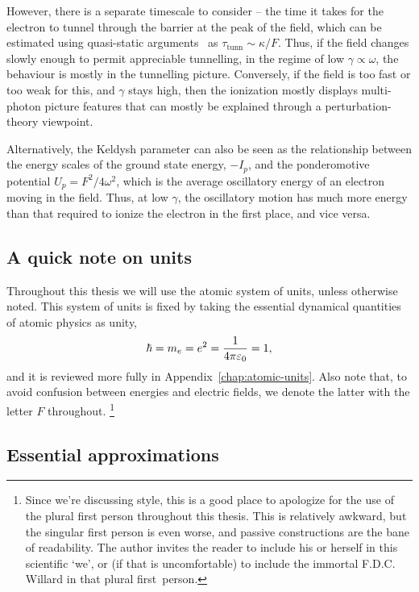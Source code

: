 However, there is a separate timescale to consider -- the time it takes for the electron to tunnel through the barrier at the peak of the field, which can be estimated using quasi-static arguments~\cite{landau_QM} as $\tau_\mathrm{tunn}\sim\kappa/F$. Thus, if the field changes slowly enough to permit appreciable tunnelling, in the regime of low $\gamma\propto\omega$, the behaviour is mostly in the tunnelling picture. Conversely, if the field is too fast or too weak for this, and $\gamma$ stays high, then the ionization mostly displays multi-photon picture features that can mostly be explained through a perturbation-theory viewpoint.

Alternatively, the Keldysh parameter can also be seen as the relationship between the energy scales of the ground state energy, $-I_p$, and the ponderomotive potential \mbox{$U_p=F^2/4\omega^2$}, which is the average oscillatory energy of an electron moving in the field. Thus, at low $\gamma$, the oscillatory motion has much more energy than that required to ionize the electron in the first place, and vice versa.




\subsection{A quick note on units}
Throughout this thesis we will use the atomic system of units, unless otherwise noted. This system of units is fixed by taking the essential dynamical quantities of atomic physics as unity,
\begin{equation}
\hbar = m_e = e^2 = \frac{1}{4\pi\varepsilon_0} = 1,
\end{equation}
and it is reviewed more fully in Appendix~\ref{chap:atomic-units}. Also note that, to avoid confusion between energies and electric fields, we denote the latter with the letter $F$ throughout.%
\footnote{%
Since we're discussing style, this is a good place to apologize for the use of the plural first person throughout this thesis. This is relatively awkward, but the singular first person is even worse, and passive constructions are the bane of readability. The author invites the reader to include his or herself in this scientific `we', or (if that is uncomfortable) to include the immortal F.D.C. Willard in that plural first~person.
}



\subsection{Essential approximations}

